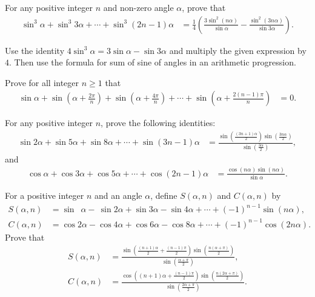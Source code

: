 \begin{question}
    For any positive integer $n$ and non-zero angle $\alpha$, prove that
    \begin{align*}
        \sin^3\alpha + \sin^3 3\alpha + \cdots + \sin^3(2n-1)\alpha &= \frac{1}{4}\left(\frac{3\sin^2(n\alpha)}{\sin \alpha} - \frac{\sin^2(3n\alpha)}{\sin 3\alpha}\right).
    \end{align*}
\end{question}

\begin{solution}
    Use the identity $4\sin^3\alpha = 3\sin \alpha - \sin 3\alpha$ and multiply the given expression by $4$. Then use the formula for sum of sine of angles in an arithmetic progression.
\end{solution}

\begin{question}
   Prove for all integer $n\geq 1$ that 
\begin{align*}
    \sin \alpha + \sin\left(\alpha+\frac{2\pi}{n}\right)  + \sin\left(\alpha+\frac{4\pi}{n}\right)  + \cdots + \sin\left(\alpha+\frac{2(n-1)\pi}{n}\right)  &= 0.  
\end{align*}
\end{question}

\begin{question}
    For any positive integer $n$, prove the following identities:
    \begin{align*}
        \sin 2\alpha + \sin 5\alpha + \sin 8\alpha + \cdots + \sin(3n-1)\alpha &= \frac{\displaystyle\sin\left(\frac{(3n+1)\alpha}{2}\right)\sin\left(\frac{3n\alpha}{2}\right)}{\displaystyle\sin\left(\frac{3\alpha}{2}\right)},
    \end{align*}
    and
    \begin{align*}
        \cos \alpha + \cos 3\alpha + \cos 5\alpha + \cdots + \cos(2n-1)\alpha &= \frac{\cos(n\alpha)\sin(n\alpha)}{\sin \alpha}.
    \end{align*}
\end{question}


\begin{question}
    For a positive integer $n$ and an angle $\alpha$, define $S(\alpha,n)$ and $C(\alpha,n)$ by
    \begin{align*}
        S(\alpha,n) &= \sin \phantom{2}\alpha - \ \sin 2\alpha + \sin 3\alpha -\sin 4\alpha + \cdots + (-1)^{n-1}\sin(n\alpha),\\
        C(\alpha,n) &= \cos 2\alpha - \cos 4\alpha + \cos 6\alpha - \cos 8\alpha + \cdots + (-1)^{n-1}\cos(2n\alpha).
    \end{align*}
    Prove that
    \begin{align*}
        S(\alpha,n) &= \frac{\displaystyle \sin\left(\frac{(n+1)\alpha}{2}+\frac{(n-1)\pi}{2}\right)\sin\left(\frac{n(\alpha+\pi)}{2}\right)}{\displaystyle \sin\left(\frac{\alpha+\pi}{2}\right)},\\
        C(\alpha,n) &= \frac{\displaystyle \cos\left((n+1)\alpha+\frac{(n-1)\pi}{2}\right)\sin\left(\frac{n(2\alpha+\pi)}{2}\right)}{\displaystyle \sin\left(\frac{2\alpha+\pi}{2}\right)}.
    \end{align*}
\end{question}


